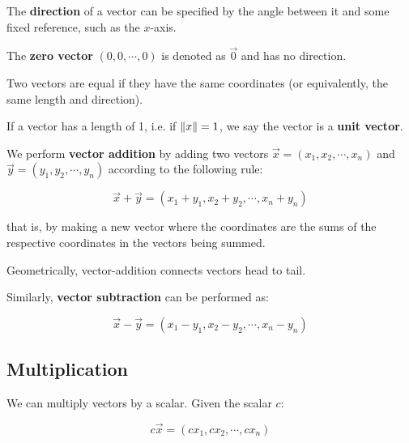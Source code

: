 \documentclass{article}
\begin{document}
\begin{definition}[Direction]
The \textbf{direction} of a \@{vector} can be specified by the angle between it and some fixed reference, such as the $x$-axis.
\end{definition}

\begin{definition}
The \textbf{zero vector} $(0, 0, \cdots, 0)$ is denoted as $\vec{0}$ and has no \@{direction}.
\end{definition}

\begin{definition}
Two \@{vectors} are equal if they have the same coordinates (or equivalently, the same \@{length} and \@{direction}).
\end{definition}

\begin{definition}
If a \@{vector} has a \@{length} of 1, i.e. if $\left\lVert x \right\rVert = 1$, we say the \@{vector} is a \textbf{unit vector}.
\end{definition}

\begin{definition}
We perform \textbf{vector addition} by adding two \@{vectors} $\vec{x} = (x_1, x_2, \cdots, x_n)$ and $\vec{y} = (y_1, y_2, \cdots, y_n)$ according to the following rule:

\[ \vec{x} + \vec{y} = (x_1 + y_1, x_2 + y_2, \cdots, x_n + y_n) \]

that is, by making a new vector where the coordinates are the sums of the respective coordinates in the vectors being summed.
\end{definition}

\begin{note}
Geometrically, \@{vector-addition} connects \@{vectors} head to tail.
\end{note}

\begin{definition}
Similarly, \textbf{vector subtraction} can be performed as:

\[ \vec{x} - \vec{y} = (x_1 - y_1, x_2 - y_2, \cdots, x_n - y_n) \]
\end{definition}

\subsection{Multiplication}
\begin{definition}
We can multiply \@{vectors} by a \@{scalar}. Given the \@{scalar} $c$:

\[ c \vec{x} = (c x_1, c x_2, \cdots, c x_n) \]
\end{definition}
\end{document}
